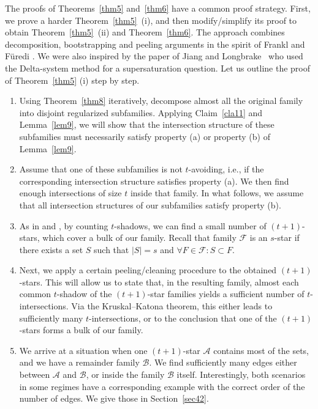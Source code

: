 \documentclass[12pt,a4paper]{article}
\newcommand{\ff}{\mathcal{F}}
\newcommand{\cA}{\mathcal{A}}
\newcommand{\bb}{\mathcal{B}}
\begin{document}
The proofs of Theorems~\ref{thm5} and~\ref{thm6} have a common proof strategy. First, we prove a harder Theorem~\ref{thm5}~(i), and then modify/simplify its proof to obtain Theorem~\ref{thm5}~(ii) and Theorem~\ref{thm6}. The approach combines decomposition, bootstrapping and peeling arguments in the spirit of Frankl and F\"uredi \cite{FF}. We were also inspired by the paper of Jiang and Longbrake~\cite{JL} who used the Delta-system method for a supersaturation question.
Let us outline the proof of Theorem~\ref{thm5} (i) step by step.  \\
\begin{enumerate}
    \item Using Theorem~\ref{thm8} iteratively, decompose almost all the original family into disjoint regularized subfamilies. Applying Claim~\ref{cla11} and Lemma~\ref{lem9}, we will show that the intersection structure of these subfamilies must necessarily satisfy property (a) or property (b) of Lemma~\ref{lem9}.
    \item Assume that one of these subfamilies is not $t$-avoiding, i.e., if the corresponding  intersection structure satisfies property (a). We then find enough intersections of size $t$ inside that family. In what follows, we assume that all intersection structures of our subfamilies satisfy property (b).
    \item As in \cite{FF} and \cite{JL}, by counting $t$-shadows, we can find a small number of $(t+1)$-stars, which cover a bulk of our family. Recall that family $\ff$ is an $s$-star if there exists a set $S$ such that $|S|=s$ and  $\forall F \in \ff: S \subset F$.
    \item Next, we apply a certain peeling/cleaning procedure to the obtained $(t+1)$-stars. This will allow us to state that, in the resulting family,  almost each common $t$-shadow of the $(t+1)$-star families yields a sufficient  number of $t$-intersections. Via the Kruskal--Katona theorem, this either leads to sufficiently many $t$-intersections, or to the conclusion that one of the $(t+1)$-stars forms a bulk of our family.
    \item We arrive at a situation when one  $(t+1)$-star $\cA$ contains most of the sets, and we have a remainder family $\bb$.  We find sufficiently many edges either between $\mathcal{A}$ and $\mathcal{B}$, or inside the family $\mathcal{B}$ itself. Interestingly, both scenarios in some regimes have a corresponding example with the correct order of the number of edges. We give those in Section~\ref{sec42}.
\end{enumerate} 
\end{document}
